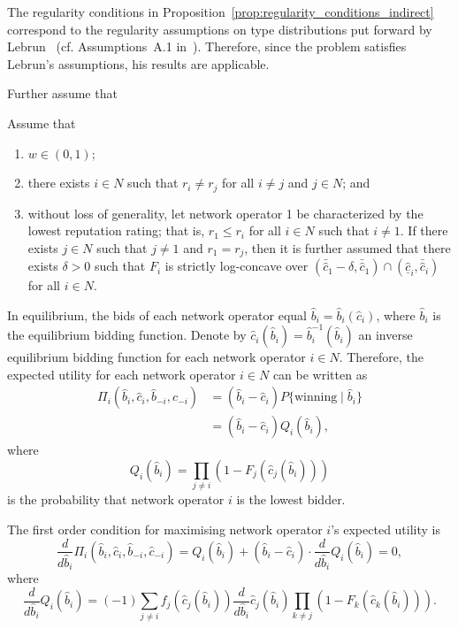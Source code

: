 The regularity conditions in Proposition~\ref{prop:regularity_conditions_indirect} correspond to the regularity assumptions on type distributions put forward by Lebrun~\cite{Lebrun2006} (cf. Assumptions~A.1 in~\cite{Lebrun2006}). Therefore, since the problem satisfies Lebrun's assumptions, his results are applicable.

Further assume that
\begin{assumptions}
\label{ass:assumptions_generic_indirect}
Assume that
\begin{enumerate}
  \item $w\in(0,1)$;
  \item there exists $i\in N$ such that $r_i\neq r_j$ for all $i\neq j$ and $j\in N$; and
  \item without loss of generality, let network operator 1 be characterized by the lowest reputation rating; that is, $r_1 \leq r_i$ for all $i\in N$ such that $i\neq 1$. If there exists $j\in N$ such that $j\neq 1$ and $r_1 = r_j$, then it is further assumed that there exists $\delta > 0$ such that $F_i$ is strictly log-concave over $(\bar{\hat{c}}_1 - \delta, \bar{\hat{c}}_1)\cap (\underline{\hat{c}}_i, \bar{\hat{c}}_i)$ for all $i\in N$.
\end{enumerate}
\end{assumptions}

In equilibrium, the bids of each network operator equal $\hat{b}_i = \hat{b}_i(\hat{c}_i)$, where $\hat{b}_i$ is the equilibrium bidding function. Denote by $\hat{c}_i(\hat{b}_i)= \hat{b}_i^{-1}(\hat{b}_i)$ an inverse equilibrium bidding function for each network operator $i\in N$. Therefore, the expected utility for each network operator $i\in N$ can be written as
\begin{align}
  \label{eq:def_expected_utility_indirect}
  \Pi_i(\hat{b}_i,\hat{c}_i,\hat{b}_{-i},\hat{c}_{-i})
  &= (\hat{b}_i - \hat{c}_i)P\{\textrm{winning}\mid\hat{b}_i\}\\ \nonumber
  &= (\hat{b}_i - \hat{c}_i)Q_i(\hat{b}_i),
\end{align}
where
\begin{equation}
Q_i(\hat{b}_i) = \prod_{j\neq i}\left( 1 - F_j(\hat{c}_j(\hat{b}_i)) \right)
\end{equation}
is the probability that network operator $i$ is the lowest bidder.

The first order condition for maximising network operator $i$'s expected utility is
\begin{equation}
  \label{eq:foc_indirect}
  \frac{d}{d\hat{b}_i}\Pi_i(\hat{b}_i,\hat{c}_i,\hat{b}_{-i},\hat{c}_{-i}) = Q_i(\hat{b}_i) + (\hat{b}_i - \hat{c}_i)\cdot\frac{d}{d\hat{b}_i}Q_i(\hat{b}_i) = 0,
\end{equation}
where
\begin{equation}
  \frac{d}{d\hat{b}_i}Q_i(\hat{b}_i) = (-1)\sum_{j\neq i} f_j(\hat{c}_j(\hat{b}_i))\frac{d}{d\hat{b}_i}\hat{c}_j(\hat{b}_i)\prod_{k\neq j} \left( 1 - F_k(\hat{c}_k(\hat{b}_i)) \right).
\end{equation}

